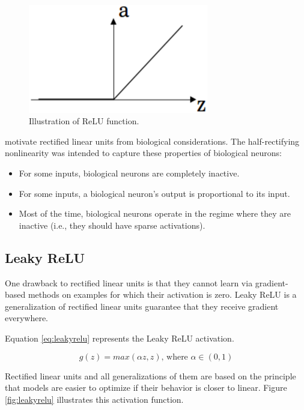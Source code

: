 \begin{figure}[!htbp]
	\centering
	\includegraphics[width=0.7\textwidth]{Cap3/relu.eps}
	\caption{Illustration of ReLU function.}
	\label{fig:relu}
\end{figure}

\cite{glorot2011a} motivate rectified linear units from
biological considerations. The half-rectifying nonlinearity was intended to capture
these properties of biological neurons: 
\begin{itemize}
\item For some inputs, biological neurons are
completely inactive. 
\item For some inputs, a biological neuron’s output is proportional
to its input. 
\item Most of the time, biological neurons operate in the regime where
they are inactive (i.e., they should have sparse activations).
\end{itemize}

\subsection{Leaky ReLU}

One drawback to rectified linear units is that they cannot learn via gradient-based methods on examples for which their activation is zero. Leaky ReLU \cite{leakyrelu} is a
generalization of rectified linear units guarantee that they receive gradient everywhere.

Equation \ref{eq:leakyrelu} represents the Leaky ReLU activation.


\begin{equation}
g(z) = max(\alpha z,z) 
\text{, where } \alpha \in (0,1)
\label{eq:leakyrelu}
\end{equation}

Rectified linear units and all generalizations of them are based on the
principle that models are easier to optimize if their behavior is closer to linear. Figure \ref{fig:leakyrelu} illustrates this activation function.



